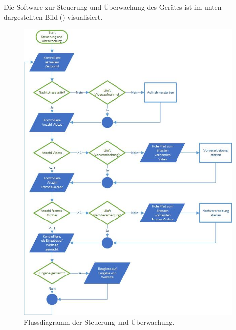 \newpage
Die Software zur Steuerung und Überwachung des Gerätes ist im unten dargestellten Bild () visualisiert.

\begin{figure}[H]
  \centering
  \includegraphics[width=0.99\textwidth]{Software/Fluss_SuU.jpg} 
  \caption{Flussdiagramm der Steuerung und Überwachung.}
  \label{bFlussSuU}
\end{figure}